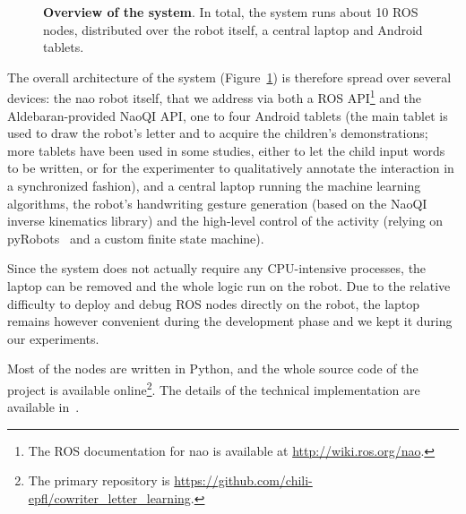 \documentclass{article}
\begin{document}
\begin{figure}[ht!]
{
}

\caption{\small \textbf{Overview of the system}. In total, the system runs about 10 ROS nodes,
    distributed over the robot itself, a central laptop and Android tablets.}

    \label{fig:archi}
\end{figure}

The overall architecture of the system (Figure~\ref{fig:archi}) is therefore
spread over several devices: the {\sc nao} robot itself, that we address via
both a ROS API\footnote{The ROS documentation for {\sc nao} is available at
\url{http://wiki.ros.org/nao}.} and the Aldebaran-provided NaoQI API, one to
four Android tablets (the main tablet is used to draw the robot's letter and to
acquire the children's demonstrations; more tablets have been used in some
studies, either to let the child input words to be written, or for the
experimenter to qualitatively annotate the interaction in a synchronized
fashion), and a central laptop running the machine learning algorithms, the
robot's handwriting gesture generation (based on the NaoQI inverse kinematics
library) and the high-level control of the activity (relying on {\sc
pyRobots}~\cite{lemaignan2015pyrobots} and a custom finite state machine).

Since the system does not actually require any CPU-intensive processes, the laptop
can be removed and the whole logic run on the robot. Due to the relative
difficulty to deploy and debug ROS nodes directly on the robot, the laptop
remains however convenient during the development phase and we kept it during
our experiments.

Most of the nodes are written in Python, and the whole source code of the
project is available online\footnote{The primary repository is
\url{https://github.com/chili-epfl/cowriter_letter_learning}.}. The details of
the technical implementation are available in~\cite{hood2015when}.
\end{document}
